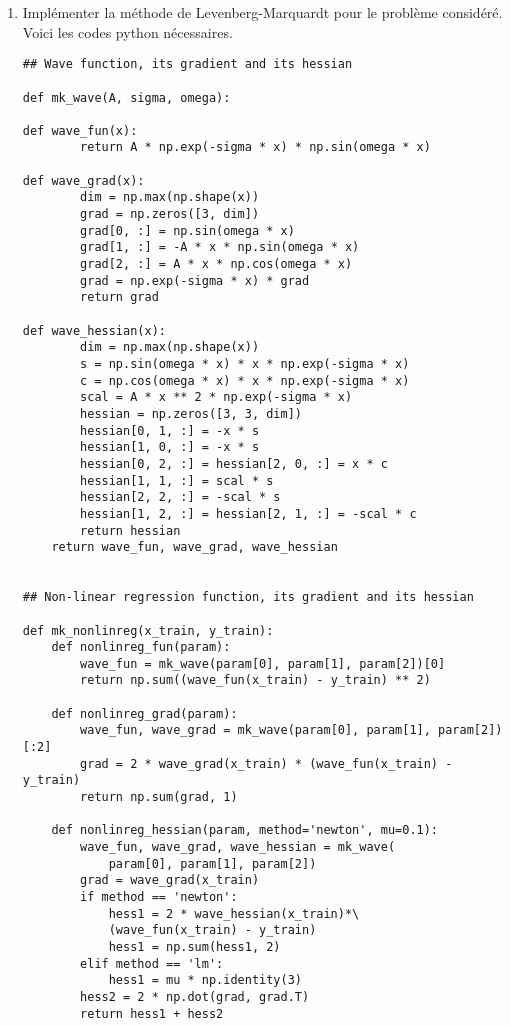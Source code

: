 \documentclass[a4paper,french,12pt]{article}
\begin{document}
\begin{enumerate}
  
\item Implémenter la méthode de Levenberg-Marquardt pour le problème considéré. Voici les codes python nécessaires.
  \begin{lstlisting}
## Wave function, its gradient and its hessian
    
def mk_wave(A, sigma, omega):

def wave_fun(x):
        return A * np.exp(-sigma * x) * np.sin(omega * x)

def wave_grad(x):
        dim = np.max(np.shape(x))
        grad = np.zeros([3, dim])
        grad[0, :] = np.sin(omega * x)
        grad[1, :] = -A * x * np.sin(omega * x)
        grad[2, :] = A * x * np.cos(omega * x)
        grad = np.exp(-sigma * x) * grad
        return grad

def wave_hessian(x):
        dim = np.max(np.shape(x))
        s = np.sin(omega * x) * x * np.exp(-sigma * x)
        c = np.cos(omega * x) * x * np.exp(-sigma * x)
        scal = A * x ** 2 * np.exp(-sigma * x)
        hessian = np.zeros([3, 3, dim])
        hessian[0, 1, :] = -x * s
        hessian[1, 0, :] = -x * s
        hessian[0, 2, :] = hessian[2, 0, :] = x * c
        hessian[1, 1, :] = scal * s
        hessian[2, 2, :] = -scal * s
        hessian[1, 2, :] = hessian[2, 1, :] = -scal * c
        return hessian
    return wave_fun, wave_grad, wave_hessian


## Non-linear regression function, its gradient and its hessian

def mk_nonlinreg(x_train, y_train):
    def nonlinreg_fun(param):
        wave_fun = mk_wave(param[0], param[1], param[2])[0]
        return np.sum((wave_fun(x_train) - y_train) ** 2)

    def nonlinreg_grad(param):
        wave_fun, wave_grad = mk_wave(param[0], param[1], param[2])[:2]
        grad = 2 * wave_grad(x_train) * (wave_fun(x_train) - y_train)
        return np.sum(grad, 1)

    def nonlinreg_hessian(param, method='newton', mu=0.1):
        wave_fun, wave_grad, wave_hessian = mk_wave(
            param[0], param[1], param[2])
        grad = wave_grad(x_train)
        if method == 'newton':
            hess1 = 2 * wave_hessian(x_train)*\
            (wave_fun(x_train) - y_train)
            hess1 = np.sum(hess1, 2)
        elif method == 'lm':
            hess1 = mu * np.identity(3)
        hess2 = 2 * np.dot(grad, grad.T)
        return hess1 + hess2


\end{lstlisting}
\end{enumerate}
\end{document}
